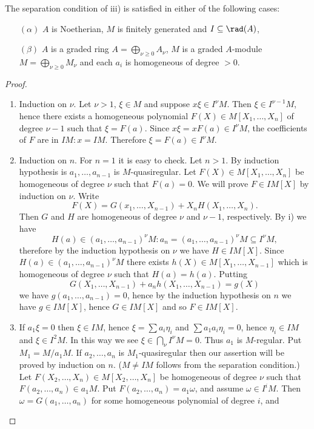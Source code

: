 \documentclass[../main]{subfiles}
\begin{document}
\begin{remark}
The separation condition of iii) is satisfied in either of the following cases:
\begin{enumerate}
    \item[$(\alpha)$] $A$ is Noetherian, $M$ is finitely generated and $I\subseteq\rad(A)$, 
    \item[$(\beta)$] $A$ is a graded ring $A=\bigoplus_{\nu\geqslant0}A_\nu$, $M$ is a graded $A$-module $M=\bigoplus_{\nu\geqslant0}M_\nu$ and each $a_i$ is homogeneous of degree $>0$.
\end{enumerate}
\end{remark}

\begin{proof}
\begin{enumerate}
    \item Induction on $\nu$. Let $\nu>1$, $\xi\in M$ and suppose $x\xi\in I^\nu M$. Then $\xi\in I^{\nu-1}M$, hence there exists a homogeneous polynomial $F(X) \in M[X_1,\ldots, X_n]$ of degree $\nu-1$ such that $\xi=F(a)$. Since \newline $x\xi = xF(a) \in I^\nu M$, the coefficients of $F$ are in $IM: x = IM$. Therefore $\xi = F(a) \in I^\nu M$.
    \item Induction on $n$. For $n = 1$ it is easy to check. Let $n>1$. By induction hypothesis is $a_1, \ldots, a_{n-1}$ is $M$-quasiregular. Let $F(X) \in M[X_1, \ldots, X_n]$ be homogeneous of degree $\nu$ such that $F(a)=0$. We will prove $F \in IM[X]$ by induction on $\nu$. Write \[F(X)=G(x_1, \ldots, X_{n-1})+X_n H(X_1, \ldots, X_n).\] Then $G$ and $H$ are homogeneous of degree $\nu$ and $\nu-1$, respectively. By i) we have \[H(a)\in(a_1, \ldots, a_{n-1})^\nu M: a_n=(a_1, \ldots, a_{n-1})^\nu M \subseteq I^\nu M,\] therefore by the induction hypothesis on $\nu$ we have $H \in IM[X]$. Since $H(a) \in(a_1, \ldots, a_{n-1})^\nu M$ there exists $h(X) \in M[X_1, \ldots, X_{n-1}]$ which is homogeneous of degree $\nu$ such that $H(a)=h(a)$. Putting \[G(X_1, \ldots, X_{n-1})+a_nh(X_1, \ldots, X_{n-1})=g(X)\]
    we have $g(a_1, \ldots, a_{n-1})=0$, hence by the induction hypothesis on $n$ we have $g \in IM[X]$, hence $G \in IM[X]$ and so $F \in I M[X]$.
    \item If $a_1 \xi=0$ then $\xi \in I M$, hence $\xi=\sum a_i \eta_i$ and $\sum a_1 a_i \eta_i=0$, hence $\eta_i \in IM$ and $\xi \in I^2 M$. In this way we see $\xi \in\bigcap_\nu I^\nu M=0$. Thus $a_1$ is $M$-regular. Put $M_1=M / a_1 M$. If $a_2,\ldots, a_n$ is $M_1$-quasiregular then our assertion will be proved by induction on $n$. ($M \neq I M$ follows from the separation condition.) Let $F(X_2, \ldots, X_n) \in M[X_2, \ldots, X_n]$ be homogeneous of degree $\nu$ such that $F(a_2, \ldots, a_n) \in a_1M$. Put $F(a_2, \ldots, a_n)=a_1\omega$, and assume $\omega \in I^i M$. Then $\omega=G(a_1, \ldots, a_n)$ for some homogeneous polynomial of degree $i$, and

\end{enumerate}
\end{proof}
\end{document}
